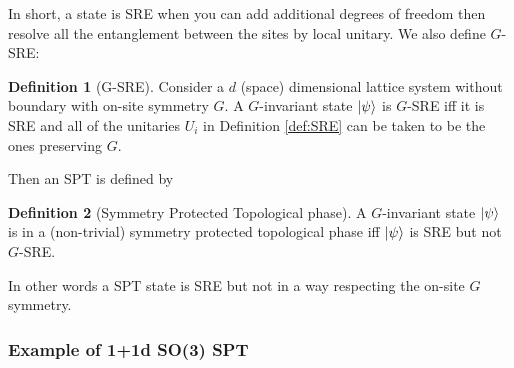 \documentclass[
]{scrartcl}
\numberwithin{equation}{section}
\theoremstyle{definition}
\newtheorem{definition}{Definition}[section]
\theoremstyle{definition}
\theoremstyle{definition}
\theoremstyle{definition}
\theoremstyle{remark}
\begin{document}
In short, a state is SRE when you can add additional degrees of freedom then resolve all the entanglement between the sites by local unitary.
We also define \(G\)-SRE:

\begin{definition}[G-SRE]
\protect\hypertarget{def:GSRE}{}\label{def:GSRE}Consider a \(d\) (space) dimensional lattice system without boundary with on-site symmetry \(G\). A \(G\)-invariant state \(\ket{\psi}\) is \(G\)-SRE iff it is SRE and all of the unitaries \(U_i\) in Definition \ref{def:SRE} can be taken to be the ones preserving \(G\).
\end{definition}

Then an SPT is defined by

\begin{definition}[Symmetry Protected Topological phase]
\protect\hypertarget{def:SPT}{}\label{def:SPT}A \(G\)-invariant state \(\ket{\psi}\) is in a (non-trivial) symmetry protected topological phase iff \(\ket{\psi}\) is SRE but not \(G\)-SRE.
\end{definition}

In other words a SPT state is SRE but not in a way respecting the on-site \(G\) symmetry.

\hypertarget{example-of-11d-so3-spt}{%
\subsubsection{Example of 1+1d SO(3) SPT}\label{example-of-11d-so3-spt}}
\end{document}
